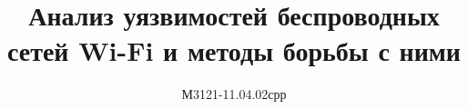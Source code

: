 \documentclass[ {{master thesis}}, draught ]{fefudoc} %
\author{М3121-11.04.02срр}{Андреев Борис Викторович}
\title{Анализ уязвимостей беспроводных сетей Wi-Fi и методы борьбы с ними}
\begin{document}
\frontpage
\signaturepage








\printbibliography
\tableofcontents
\appendix



\end{document}
